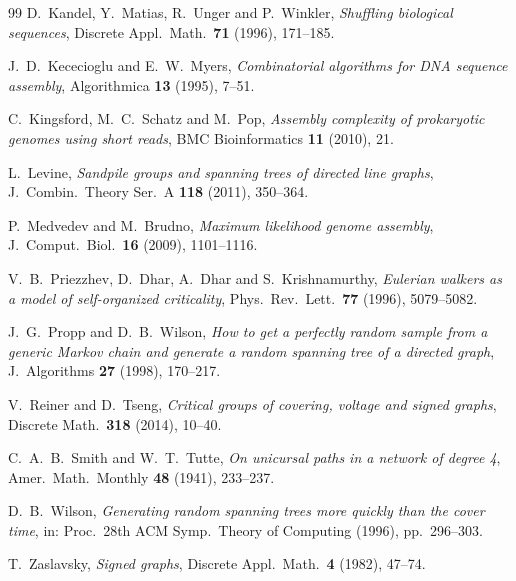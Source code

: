 \documentclass[11pt]{article}
\theoremstyle{plain}
\theoremstyle{definition}
\theoremstyle{remark}
\begin{document}
\begin{thebibliography}{99}
 D.~Kandel, Y.~Matias, R.~Unger and P.~Winkler,
\emph{Shuffling biological sequences},
Discrete Appl.\ Math.\ \textbf{71} (1996), 171--185.

 J.~D.~Kececioglu and E.~W.~Myers,
\emph{Combinatorial algorithms for DNA sequence assembly},
Algorithmica \textbf{13} (1995), 7--51.

 C.~Kingsford, M.~C.~Schatz and M.~Pop,
\emph{Assembly complexity of prokaryotic genomes using short reads},
BMC Bioinformatics \textbf{11} (2010), 21.

 L.~Levine,
\emph{Sandpile groups and spanning trees of directed line graphs},
J.\ Combin.\ Theory Ser.~A \textbf{118} (2011), 350--364.

 P.~Medvedev and M.~Brudno,
\emph{Maximum likelihood genome assembly},
J.\ Comput.\ Biol.\ \textbf{16} (2009), 1101--1116.

 V.~B.~Priezzhev, D.~Dhar, A.~Dhar and S.~Krishnamurthy,
\emph{Eulerian walkers as a model of self-organized criticality},
Phys.\ Rev.\ Lett.\ \textbf{77} (1996), 5079--5082.

 J.~G.~Propp and D.~B.~Wilson,
\emph{How to get a perfectly random sample from a generic Markov chain and generate a
random spanning tree of a directed graph}, J.\ Algorithms \textbf{27} (1998), 170--217.

 V.~Reiner and D.~Tseng,
\emph{Critical groups of covering, voltage and signed graphs},
Discrete Math.\ \textbf{318} (2014), 10--40.

 C.~A.~B.~Smith and W.~T.~Tutte,
\emph{On unicursal paths in a network of degree 4},
Amer.\ Math.\ Monthly \textbf{48} (1941), 233--237.

 D.~B.~Wilson,
\emph{Generating random spanning trees more quickly than the cover time},
in: Proc.\ 28th ACM Symp.\ Theory of Computing (1996), pp.~296--303.

 T.~Zaslavsky,
\emph{Signed graphs},
Discrete Appl.\ Math.\ \textbf{4} (1982), 47--74.

\end{thebibliography}
\end{document}
